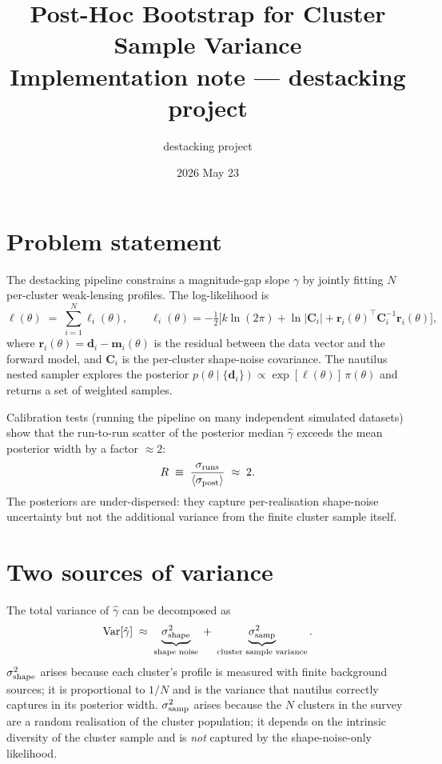 \documentclass[11pt,a4paper]{article}
\title{\textbf{Post-Hoc Bootstrap for Cluster Sample Variance}\\[0.4em]
\large Implementation note — destacking project}
\author{destacking project}
\date{2026 May 23}
\begin{document}
\maketitle

\section{Problem statement}

The destacking pipeline constrains a magnitude-gap slope $\gamma$ by jointly
fitting $N$ per-cluster weak-lensing profiles.  The log-likelihood is
\begin{equation}
  \ell(\theta) \;=\; \sum_{i=1}^{N} \ell_i(\theta),
  \qquad
  \ell_i(\theta) = -\tfrac{1}{2}\bigl[
    k\ln(2\pi) + \ln|\mathbf{C}_i| +
    \mathbf{r}_i(\theta)^\top \mathbf{C}_i^{-1}\mathbf{r}_i(\theta)
  \bigr],
\end{equation}
where $\mathbf{r}_i(\theta) = \mathbf{d}_i - \mathbf{m}_i(\theta)$ is the
residual between the data vector and the forward model, and $\mathbf{C}_i$
is the per-cluster shape-noise covariance.  The nautilus nested sampler
explores the posterior $p(\theta\mid\{\mathbf{d}_i\}) \propto
\exp[\ell(\theta)]\,\pi(\theta)$ and returns a set of weighted samples.

Calibration tests (running the pipeline on many independent simulated
datasets) show that the run-to-run scatter of the posterior median
$\hat\gamma$ exceeds the mean posterior width by a factor $\approx 2$:
\begin{equation}
  R \;\equiv\; \frac{\sigma_{\rm runs}}{\langle\sigma_{\rm post}\rangle}
  \;\approx\; 2.
\end{equation}
The posteriors are under-dispersed: they capture per-realisation shape-noise
uncertainty but not the additional variance from the finite cluster sample
itself.

\section{Two sources of variance}

The total variance of $\hat\gamma$ can be decomposed as
\begin{equation}
  \mathrm{Var}[\hat\gamma]
  \;\approx\;
  \underbrace{\sigma_{\rm shape}^2}_{\text{shape noise}}
  \;+\;
  \underbrace{\sigma_{\rm samp}^2}_{\text{cluster sample variance}}.
\end{equation}
$\sigma_{\rm shape}^2$ arises because each cluster's profile is measured with
finite background sources; it is proportional to $1/N$ and is the variance
that nautilus correctly captures in its posterior width.
$\sigma_{\rm samp}^2$ arises because the $N$ clusters in the survey are a
random realisation of the cluster population; it depends on the intrinsic
diversity of the cluster sample and is \emph{not} captured by the
shape-noise-only likelihood.
\end{document}
